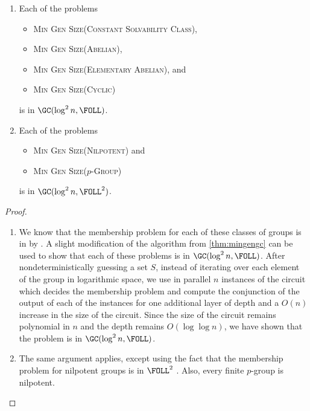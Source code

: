 \documentclass{article}
\begin{document}
\begin{theorem}
  \mbox{}
  \begin{enumerate}
  \item Each of the problems
    \begin{itemize}
    \item \textsc{Min Gen Size(Constant Solvability Class)},
    \item \textsc{Min Gen Size(Abelian)},
    \item \textsc{Min Gen Size(Elementary Abelian)}, and
    \item \textsc{Min Gen Size(Cyclic)}
    \end{itemize}
    is in $\GC(\log^2 n, \FOLL)$.
  \item Each of the problems
    \begin{itemize}
    \item \textsc{Min Gen Size(Nilpotent)} and
    \item \textsc{Min Gen Size($p$-Group)}
    \end{itemize}
    is in $\GC(\log^2 n, \FOLL^2)$.
  \end{enumerate}
\end{theorem}
\begin{proof}
  \mbox{}
  \begin{enumerate}
  \item
    We know that the membership problem for each of these classes of groups is in \FOLL{} by \cite[Section~3]{bklm01}.
    A slight modification of the algorithm from \autoref{thm:mingengc} can be used to show that each of these problems is in $\GC(\log^2 n, \FOLL)$.
    After nondeterministically guessing a set $S$, instead of iterating over each element of the group in logarithmic space, we use in parallel $n$ instances of the \FOLL{} circuit which decides the membership problem and compute the conjunction of the output of each of the instances for one additional layer of depth and a $O(n)$ increase in the size of the circuit.
    Since the size of the circuit remains polynomial in $n$ and the depth remains $O(\log \log n)$, we have shown that the problem is in $\GC(\log^2 n, \FOLL)$.
  \item
    The same argument applies, except using the fact that the membership problem for nilpotent groups is in $\FOLL^2$ \cite[Corollary~3.12]{bklm01}.
    Also, every finite $p$-group is nilpotent. \qedhere
  \end{enumerate}
\end{proof}
\end{document}
